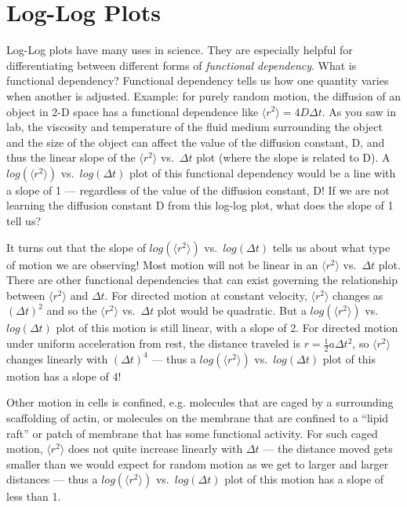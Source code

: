 \chapter{Log-Log Plots}
\thispagestyle{fancy}

Log-Log plots have many uses in science.
They are especially helpful for differentiating between different forms of \emph{functional dependency}.
What is functional dependency? 
Functional dependency tells us how one quantity varies when another is adjusted. 
Example: for purely random motion, the diffusion of an object in 2-D space has a functional dependence like $\langle r^{2} \rangle = 4 D \Delta t$. 
As you saw in lab, the viscosity and temperature of the fluid medium surrounding the object and the size of the object can affect the value of the diffusion constant, D, and thus the linear slope of the $\langle r^{2} \rangle$ vs.\ $\Delta t$ plot (where the slope is related to D). 
A $log(\langle r^{2} \rangle)$ vs.\ $log(\Delta t)$ plot of this functional dependency would be a line with a slope of 1 — regardless of the value of the diffusion constant, D! 
If we are not learning the diffusion constant D from this log-log plot, what does the slope of 1 tell us?
\par 
It turns out that the slope of $log(\langle r^{2} \rangle)$ vs.\ $log(\Delta t)$ tells us about what type of motion we are observing! 
Most motion will not be linear in an $\langle r^{2} \rangle$ vs.\ $\Delta t$ plot. 
There are other functional dependencies that can exist governing the relationship between $\langle r^{2} \rangle$ and $\Delta t$. 
For directed motion at constant velocity, $\langle r^{2} \rangle$ changes as $(\Delta t)^{2}$ and so the $\langle r^{2} \rangle$ vs.\ $\Delta t$ plot would be quadratic. 
But a $log(\langle r^{2} \rangle)$ vs.\ $log(\Delta t)$ plot of this motion is still linear, with a slope of 2. 
For directed motion under uniform acceleration from rest, the distance traveled is $r = \frac{1}{2} a \Delta t^{2}$, so $\langle r^{2} \rangle$ changes linearly with $(\Delta t)^{4}$ — thus a $log(\langle r^{2} \rangle)$ vs.\ $log(\Delta t)$ plot of this motion has a slope of 4!
\par 
Other motion in cells is confined, e.g. molecules that are caged by a surrounding scaffolding of actin, or molecules on the membrane that are confined to a ``lipid raft'' or patch of membrane that has some functional activity. 
For such caged motion, $\langle r^{2} \rangle$ does not quite increase linearly with $\Delta t$ — the distance moved gets smaller than we would expect for random motion as we get to larger and larger distances — thus a $log(\langle r^{2} \rangle)$ vs.\ $log(\Delta t)$ plot of this motion has a slope of less than 1.
